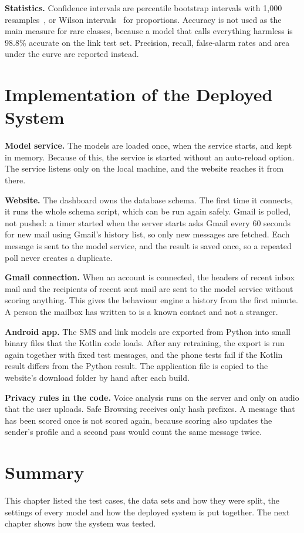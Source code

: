 {\textbf{Statistics.} Confidence intervals are percentile bootstrap intervals with 1{,}000 resamples~\cite{efron1993bootstrap}, or Wilson intervals~\cite{wilson1927} for proportions. Accuracy is not used as the main measure for rare classes, because a model that calls everything harmless is 98.8\% accurate on the link test set. Precision, recall, false-alarm rates and area under the curve are reported instead.

\section{Implementation of the Deployed System}
\textbf{Model service.} The models are loaded once, when the service starts, and kept in memory. Because of this, the service is started without an auto-reload option. The service listens only on the local machine, and the website reaches it from there.

\textbf{Website.} The dashboard owns the database schema. The first time it connects, it runs the whole schema script, which can be run again safely. Gmail is polled, not pushed: a timer started when the server starts asks Gmail every 60 seconds for new mail using Gmail's history list, so only new messages are fetched. Each message is sent to the model service, and the result is saved once, so a repeated poll never creates a duplicate.

\textbf{Gmail connection.} When an account is connected, the headers of recent inbox mail and the recipients of recent sent mail are sent to the model service without scoring anything. This gives the behaviour engine a history from the first minute. A person the mailbox has written to is a known contact and not a stranger.

\textbf{Android app.} The SMS and link models are exported from Python into small binary files that the Kotlin code loads. After any retraining, the export is run again together with fixed test messages, and the phone tests fail if the Kotlin result differs from the Python result. The application file is copied to the website's download folder by hand after each build.

\textbf{Privacy rules in the code.} Voice analysis runs on the server and only on audio that the user uploads. Safe Browsing receives only hash prefixes. A message that has been scored once is not scored again, because scoring also updates the sender's profile and a second pass would count the same message twice.

\section{Summary}
This chapter listed the test cases, the data sets and how they were split, the settings of every model and how the deployed system is put together. The next chapter shows how the system was tested.

}
